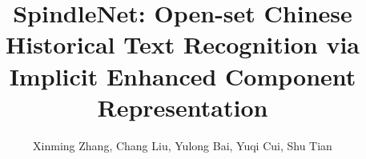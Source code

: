 \documentclass{IEEEcsmag}
\begin{document}

\title{SpindleNet: Open-set Chinese Historical Text Recognition via Implicit Enhanced Component Representation}

\author{Xinming Zhang, Chang Liu, Yulong Bai, Yuqi Cui, Shu Tian}



\maketitle










\end{document}
